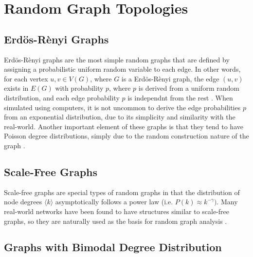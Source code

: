\documentclass[11pt]{article}
\begin{document}
\section{Random Graph Topologies}


\subsection{Erd\"{o}s-R\`{e}nyi Graphs}
Erd\"{o}s-R\`{e}nyi graphs are the most simple random graphs that are defined by assigning a probabilistic uniform random variable to each edge. In other words, for each vertex $u, v \in V(G)$, where $G$ is a Erd\"{o}s-R\`{e}nyi graph, the edge $(u,v)$ exists in $E(G)$ with probability $p$, where $p$ is derived from a uniform random distribution, and each edge probability $p$ is independnt from the rest \cite{LargeNetworkRobustness-PVM}. When simulated using computers, it is not uncommon to derive the edge probabilities $p$ from an exponential distribution, due to its simplicity and similarity with the real-world. Another important element of these graphs is that they tend to have Poisson degree distributions, simply due to the random construction nature of the graph \cite{bimodal}.


\subsection{Scale-Free Graphs}
Scale-free graphs are special types of random graphs in that the distribution of node degrees $\langle k \rangle$ asymptotically follows a power law (i.e. $P(k) \approx k^{-\gamma})$. Many real-world networks have been found to have structures similar to scale-free graphs, so they are naturally used as the basis for random graph analysis \cite{AttacksWavesRandom}. 


\subsection{Graphs with Bimodal Degree Distribution}
\end{document}
